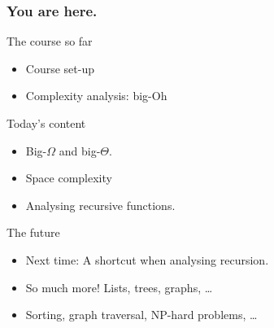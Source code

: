 \begin{frame}
	\frametitle{You are here.}
	\begin{block}{The course so far}
		\begin{itemize}
			\item Course set-up
			\item Complexity analysis: big-Oh
		\end{itemize}
	\end{block}
	\pause
	\begin{exampleblock}{Today's content}
		\begin{itemize}
			\item Big-$\Omega$ and big-$\Theta$.
			\item Space complexity
			\item Analysing recursive functions.
		\end{itemize}
	\end{exampleblock}
	\pause
	\begin{block}{The future}
		\begin{itemize}
			\item Next time: A shortcut when analysing recursion.
			\item So much more! Lists, trees, graphs, \dots
			\item Sorting, graph traversal, NP-hard problems, \dots
		\end{itemize}
	\end{block}
\end{frame}
